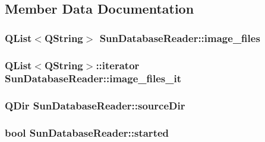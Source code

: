 \subsection{Member Data Documentation}
\hypertarget{class_sun_database_reader_a155716f43a3dc33e1a4d0a2a4a9f3ff1}{
\subsubsection[{image\+\_\+files}]{\setlength{\rightskip}{0pt plus 5cm}Q\+List$<$Q\+String$>$ Sun\+Database\+Reader\+::image\+\_\+files\hspace{0.3cm}{\ttfamily [private]}}}\label{class_sun_database_reader_a155716f43a3dc33e1a4d0a2a4a9f3ff1}
\hypertarget{class_sun_database_reader_a227d88c9c5c3d37b0f27123027c0b00e}{
\subsubsection[{image\+\_\+files\+\_\+it}]{\setlength{\rightskip}{0pt plus 5cm}Q\+List$<$Q\+String$>$\+::iterator Sun\+Database\+Reader\+::image\+\_\+files\+\_\+it\hspace{0.3cm}{\ttfamily [private]}}}\label{class_sun_database_reader_a227d88c9c5c3d37b0f27123027c0b00e}
\hypertarget{class_sun_database_reader_a6bfc31b2ba24be2b3e18c32e0d343d70}{
\subsubsection[{source\+Dir}]{\setlength{\rightskip}{0pt plus 5cm}Q\+Dir Sun\+Database\+Reader\+::source\+Dir\hspace{0.3cm}{\ttfamily [private]}}}\label{class_sun_database_reader_a6bfc31b2ba24be2b3e18c32e0d343d70}
\hypertarget{class_sun_database_reader_aa0b0c1f783f4382a9c8b10a1de1fec71}{
\subsubsection[{started}]{\setlength{\rightskip}{0pt plus 5cm}bool Sun\+Database\+Reader\+::started\hspace{0.3cm}{\ttfamily [private]}}}\label{class_sun_database_reader_aa0b0c1f783f4382a9c8b10a1de1fec71}
